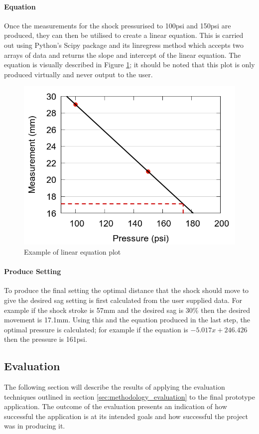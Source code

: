 		\paragraph{Equation}
			Once the measurements for the shock pressurised to 100psi and 150psi are produced, they can then be utilised to create a linear equation. This is carried out using Python's Scipy package and its linregress method which accepts two arrays of data and returns the slope and intercept of the linear equation. The equation is visually described in Figure \ref{fig:equation_plot}; it should be noted that this plot is only produced virtually and never output to the user.
			\begin{figure}[h!]
				\centering
				\includegraphics[scale=0.4]{../images/results/scatter_dotted.png}
				\caption{Example of linear equation plot}
				\label{fig:equation_plot}
			\end{figure}
		\paragraph{Produce Setting}
			To produce the final setting the optimal distance that the shock should move to give the desired sag setting is first calculated from the user supplied data. For example if the shock stroke is 57mm and the desired sag is 30\% then the desired movement is 17.1mm. Using this and the equation produced in the last step, the optimal pressure is calculated; for example if the equation is $-5.017x + 246.426$ then the pressure is 161psi.
\clearpage
	\subsection{Evaluation}
		The following section will describe the results of applying the evaluation techniques outlined in section \ref{sec:methodology_evaluation} to the final prototype application. The outcome of the evaluation presents an indication of how successful the application is at its intended goals and how successful the project was in producing it.
